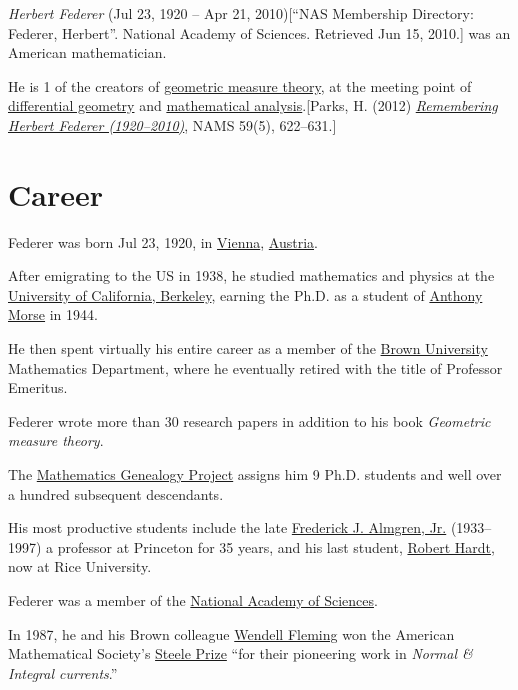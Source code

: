 \documentclass{book}
\numberwithin{equation}{section}
\begin{document}
\textit{Herbert Federer} (Jul 23, 1920 -- Apr 21, 2010)[``NAS Membership Directory: Federer, Herbert''. National Academy of Sciences. Retrieved Jun 15, 2010.] was an American mathematician.

He is 1 of the creators of \href{https://en.wikipedia.org/wiki/Geometric_measure_theory}{geometric measure theory}, at the meeting point of \href{https://en.wikipedia.org/wiki/Differential_geometry}{differential geometry} and \href{https://en.wikipedia.org/wiki/Mathematical_analysis}{mathematical analysis}.[Parks, H. (2012) \href{http://www.ams.org/notices/201205/rtx120500622p.pdf}{\textit{Remembering Herbert Federer (1920--2010)}}, NAMS 59(5), 622--631.]
    
\section{Career}
Federer was born Jul 23, 1920, in \href{https://en.wikipedia.org/wiki/Vienna}{Vienna}, \href{https://en.wikipedia.org/wiki/Austria}{Austria}.

After emigrating to the US in 1938, he studied mathematics and physics at the \href{https://en.wikipedia.org/wiki/University_of_California,_Berkeley}{University of California, Berkeley}, earning the Ph.D. as a student of \href{https://en.wikipedia.org/wiki/Anthony_Morse}{Anthony Morse} in 1944.

He then spent virtually his entire career as a member of the \href{https://en.wikipedia.org/wiki/Brown_University}{Brown University} Mathematics Department, where he eventually retired with the title of Professor Emeritus.

%
Federer wrote more than 30 research papers in addition to his book \textit{Geometric measure theory}.

The \href{https://en.wikipedia.org/wiki/Mathematics_Genealogy_Project}{Mathematics Genealogy Project} assigns him 9 Ph.D. students and well over a hundred subsequent descendants.

His most productive students include the late \href{https://en.wikipedia.org/wiki/Frederick_J._Almgren,_Jr.}{Frederick J. Almgren, Jr.} (1933--1997) a professor at Princeton for 35 years, and his last student, \href{https://en.wikipedia.org/wiki/Robert_Miller_Hardt}{Robert Hardt}, now at Rice University.

%
Federer was a member of the \href{https://en.wikipedia.org/wiki/United_States_National_Academy_of_Sciences}{National Academy of Sciences}.

In 1987, he and his Brown colleague \href{https://en.wikipedia.org/wiki/Wendell_Fleming}{Wendell Fleming} won the American Mathematical Society's \href{https://en.wikipedia.org/wiki/Steele_Prize}{Steele Prize} ``for their pioneering work in \textit{Normal \& Integral currents}.''
\end{document}
